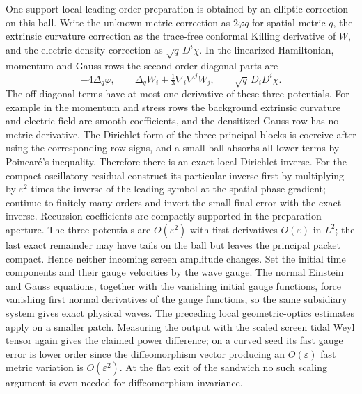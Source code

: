 \documentclass[11pt]{article}
\newcommand{\eps}{\varepsilon}
\begin{document}
One support-local leading-order preparation is obtained by an elliptic correction on this ball. Write the unknown metric correction as \(2\varphi q\) for spatial metric \(q\), the extrinsic curvature correction as the trace-free conformal Killing derivative of \(W\), and the electric density correction as \(\sqrt q\,D^i\chi\). In the linearized Hamiltonian, momentum and Gauss rows the second-order diagonal parts are
\[
 -4\Delta_q\varphi,\qquad
 \Delta_q W_i+\tfrac13\nabla_i\nabla^jW_j,\qquad
 \sqrt q\,D_iD^i\chi .
\]
The off-diagonal terms have at most one derivative of these three potentials. For example in the momentum and stress rows the background extrinsic curvature and electric field are smooth coefficients, and the densitized Gauss row has no metric derivative. The Dirichlet form of the three principal blocks is coercive after using the corresponding row signs, and a small ball absorbs all lower terms by Poincar\'e's inequality. Therefore there is an exact local Dirichlet inverse. For the compact oscillatory residual construct its particular inverse first by multiplying by \(\eps^2\) times the inverse of the leading symbol at the spatial phase gradient; continue to finitely many orders and invert the small final error with the exact inverse. Recursion coefficients are compactly supported in the preparation aperture. The three potentials are \(O(\eps^2)\) with first derivatives \(O(\eps)\) in \(L^2\); the last exact remainder may have tails on the ball but leaves the principal packet compact. Hence neither incoming screen amplitude changes. Set the initial time components and their gauge velocities by the wave gauge. The normal Einstein and Gauss equations, together with the vanishing initial gauge functions, force vanishing first normal derivatives of the gauge functions, so the same subsidiary system gives exact physical waves. The preceding local geometric-optics estimates apply on a smaller patch. Measuring the output with the scaled screen tidal Weyl tensor again gives the claimed power difference; on a curved seed its fast gauge error is lower order since the diffeomorphism vector producing an \(O(\eps)\) fast metric variation is \(O(\eps^2)\). At the flat exit of the sandwich no such scaling argument is even needed for diffeomorphism invariance.
\end{document}
